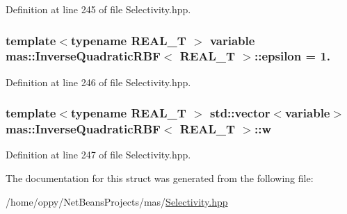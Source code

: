 Definition at line 245 of file Selectivity.\-hpp.

\hypertarget{structmas_1_1_inverse_quadratic_r_b_f_af694b194e549a0883ba192dec7bd9923}{
\subsubsection[{epsilon}]{\setlength{\rightskip}{0pt plus 5cm}template$<$typename R\-E\-A\-L\-\_\-\-T $>$ {\bf variable} {\bf mas\-::\-Inverse\-Quadratic\-R\-B\-F}$<$ R\-E\-A\-L\-\_\-\-T $>$\-::epsilon = 1.}}\label{structmas_1_1_inverse_quadratic_r_b_f_af694b194e549a0883ba192dec7bd9923}


Definition at line 246 of file Selectivity.\-hpp.

\hypertarget{structmas_1_1_inverse_quadratic_r_b_f_a1e927c1c6b714eb3ca9e6deece81e60e}{
\subsubsection[{w}]{\setlength{\rightskip}{0pt plus 5cm}template$<$typename R\-E\-A\-L\-\_\-\-T $>$ std\-::vector$<${\bf variable}$>$ {\bf mas\-::\-Inverse\-Quadratic\-R\-B\-F}$<$ R\-E\-A\-L\-\_\-\-T $>$\-::w}}\label{structmas_1_1_inverse_quadratic_r_b_f_a1e927c1c6b714eb3ca9e6deece81e60e}


Definition at line 247 of file Selectivity.\-hpp.



The documentation for this struct was generated from the following file\-:\begin{DoxyCompactItemize}
\item 
/home/oppy/\-Net\-Beans\-Projects/mas/\hyperlink{_selectivity_8hpp}{Selectivity.\-hpp}\end{DoxyCompactItemize}
